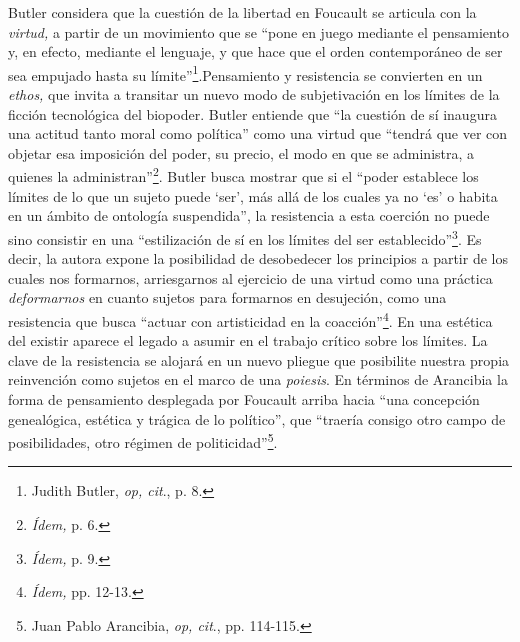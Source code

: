 Butler considera que la cuestión de la libertad en Foucault se articula con la \emph{virtud,} a partir de un movimiento que se \enquote{pone en juego mediante el pensamiento y, en efecto, mediante el lenguaje, y que hace que el orden contemporáneo de ser sea empujado hasta su límite}\footnote{Judith Butler, \emph{op, cit}., p. 8.}.Pensamiento y resistencia se convierten en un \emph{ethos,} que invita a transitar un nuevo modo de subjetivación en los límites de la ficción tecnológica del biopoder. Butler entiende que \enquote{la cuestión de sí inaugura una actitud tanto moral como política} como una virtud que \enquote{tendrá que ver con objetar esa imposición del poder, su precio, el modo en que se administra, a quienes la administran}\footnote{\emph{Ídem,} p. 6.}. Butler busca mostrar que si el \enquote{poder establece los límites de lo que un sujeto puede \enquote{ser}, más allá de los cuales ya no \enquote{es} o habita en un ámbito de ontología suspendida}, la resistencia a esta coerción no puede sino consistir en una \enquote{estilización de sí en los límites del ser establecido}\footnote{\emph{Ídem,} p. 9.}. Es decir, la autora expone la posibilidad de desobedecer los principios a partir de los cuales nos formarnos, arriesgarnos al ejercicio de una virtud como una práctica \emph{deformarnos} en cuanto sujetos para formarnos en desujeción, como una resistencia que busca \enquote{actuar con artisticidad en la coacción}\footnote{\emph{Ídem,} pp. 12-13.}. En una estética del existir aparece el legado a asumir en el trabajo crítico sobre los límites. La clave de la resistencia se alojará en un nuevo pliegue que posibilite nuestra propia reinvención como sujetos en el marco de una \emph{poiesis}. En términos de Arancibia la forma de pensamiento desplegada por Foucault arriba hacia \enquote{una concepción genealógica, estética y trágica de lo político}, que \enquote{traería consigo otro campo de posibilidades, otro régimen de politicidad}\footnote{Juan Pablo Arancibia, \emph{op, cit}., pp. 114-115.}.


